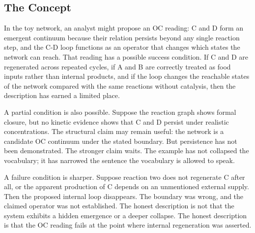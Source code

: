 \documentclass[11pt,a4paper,openany]{book}
\begin{document}
\subsection{The Concept}
In the toy network, an analyst might propose an OC reading: C and D form an emergent continuum because their relation persists beyond any single reaction step, and the C-D loop functions as an operator that changes which states the network can reach. That reading has a possible success condition. If C and D are regenerated across repeated cycles, if A and B are correctly treated as food inputs rather than internal products, and if the loop changes the reachable states of the network compared with the same reactions without catalysis, then the description has earned a limited place. \cite{haken_synergetics,nicolis_prigogine_selforg}\par
A partial condition is also possible. Suppose the reaction graph shows formal closure, but no kinetic evidence shows that C and D persist under realistic concentrations. The structural claim may remain useful: the network is a candidate OC continuum under the stated boundary. But persistence has not been demonstrated. The stronger claim waits. The example has not collapsed the vocabulary; it has narrowed the sentence the vocabulary is allowed to speak.\par
A failure condition is sharper. Suppose reaction two does not regenerate C after all, or the apparent production of C depends on an unmentioned external supply. Then the proposed internal loop disappears. The boundary was wrong, and the claimed operator was not established. The honest description is not that the system exhibits a hidden emergence or a deeper collapse. The honest description is that the OC reading fails at the point where internal regeneration was asserted.\par
\end{document}

